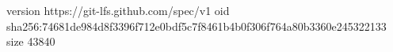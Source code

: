version https://git-lfs.github.com/spec/v1
oid sha256:74681de984d8f3396f712e0bdf5c7f8461b4b0f306f764a80b3360e245322133
size 43840
